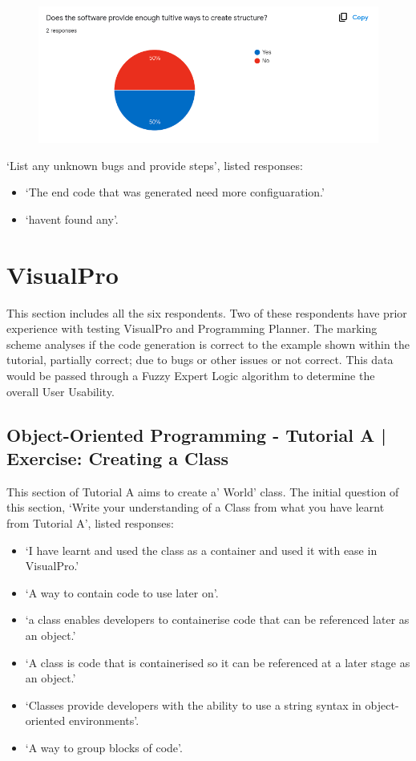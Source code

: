 \documentclass[12pt]{report} %
\begin{document}
			\begin{figure}[H]
				{\includegraphics[scale=0.50]{Figures/VisualPro-Survey_Results/SQ-A5.png}}
			\end{figure}

			`List any unknown bugs and provide steps', listed responses:
			\begin{itemize}
				\item `The end code that was generated need more configuaration.'
				\item `havent found any'.
			\end{itemize}

		\section{VisualPro}
			This section includes all the six respondents. Two of these respondents have prior experience with testing VisualPro and Programming Planner. The marking scheme analyses if the code generation is correct to the example shown within the tutorial, partially correct; due to bugs or other issues or not correct. This data would be passed through a Fuzzy Expert Logic algorithm to determine the overall User Usability.
			\subsection{Object-Oriented Programming - Tutorial A | Exercise: Creating a Class}
				This section of Tutorial A aims to create a' World' class. The initial question of this section, `Write your understanding of a Class from what you have learnt from Tutorial A', listed responses:
				\begin{itemize}
					\item `I have learnt and used the class as a container and used it with ease in VisualPro.'
					\item `A way to contain code to use later on'.
					\item `a class enables developers to containerise code that can be referenced later as an object.'
					\item `A class is code that is containerised so it can be referenced at a later stage as an object.'
					\item `Classes provide developers with the ability to use a string syntax in object-oriented environments'.
					\item `A way to group blocks of code'.
				\end{itemize}
\end{document}
